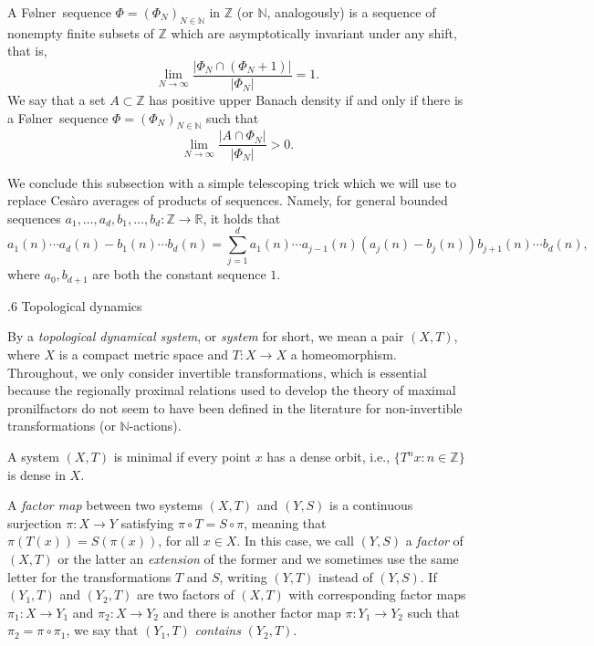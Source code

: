 \documentclass[reqno]{amsart}
\makeatletter
\def\R{{\mathbb R}}
\def\Z{{\mathbb Z}}
\def\N{{\mathbb N}}
\theoremstyle{definition}
\def\subsection{\@startsection{subsection}{2}%
  \z@{.4\linespacing\@plus.7\linespacing}
{.6\baselineskip}%
  {\normalfont\centering\bfseries}%
}
\theoremstyle{remark}
\def\N{{\mathbb N}}
\newcommand{\Folner}{F\o{}lner}
\makeatother
\begin{document}
A \Folner\ sequence $\Phi=(\Phi_N)_{N\in \N}$ in $\Z$ (or $\N$, analogously)  
is a sequence of nonempty finite subsets of $\Z$ which are 
asymptotically invariant under any shift, that is, 
$$\lim_{N\to \infty} \frac{|\Phi_N \cap (\Phi_N+1)|}{|\Phi_N|}=1.$$
We say that a set $A\subset \Z$ has positive upper Banach density if and only if there is a \Folner\ sequence $\Phi=(\Phi_N)_{N\in \N}$ such that 
$$ \lim_{N\to \infty} \frac{|A\cap \Phi_N|}{|\Phi_N|}>0.$$

We conclude this subsection with a simple telescoping trick which we will use 
to replace Ces\`aro averages of products of sequences. 
Namely, for general bounded sequences $a_1,\ldots,a_d,b_1,\ldots,b_d:\Z\to \R$, it 
holds that 
\begin{equation}\label{eq:18}
a_1(n)\cdots a_d(n)- b_1(n)\cdots b_d(n)=\sum_{j=1}^d a_1(n)\cdots a_{j-1}(n)(a_j(n)-b_j(n))b_{j+1}(n)\cdots b_d(n),
\end{equation} 
where $a_0, b_{d+1}$ are both the constant sequence $1$. 

\subsection{Topological dynamics}\label{prel dynamics}

By a \textit{topological dynamical system}, or \textit{system} for short, we mean a pair $(X,T)$, 
where $X$ is a compact metric space and $T: X\to X$ a 
homeomorphism. 
Throughout, we only consider invertible transformations, which is 
essential because the regionally proximal relations used to 
develop the theory of maximal pronilfactors do not seem to have 
been defined in the literature for non-invertible transformations (or $\N$-actions). 

A system $(X,T)$ is minimal if every point $x$ has a dense orbit, 
i.e., $\{T^nx: n\in \Z\}$ is dense in $X$. 

A \textit{factor map} between two systems $(X,T)$ and $(Y,S)$ is a 
continuous surjection $\pi:X\to Y$ satisfying 
$\pi \circ T=S\circ \pi$, meaning that $\pi(T(x))=S(\pi(x))$, 
for all $x\in X$. In this case, we call $(Y,S)$ a \textit{factor} 
of $(X,T)$ or the latter an \textit{extension} of the former and 
we sometimes use the same letter for the transformations $T$ and 
$S$, writing $(Y,T)$ instead of $(Y,S)$. If $(Y_1,T)$ and $(Y_2,T)$ are two factors of $(X,T)$ with corresponding factor maps $\pi_1:X\to Y_1$ and $\pi_2:X\to Y_2$ and there is another factor map $\pi:Y_1\to Y_2$ such that $\pi_2=\pi \circ \pi_1$, we say that $(Y_1,T)$ \textit{contains} $(Y_2,T)$. 
\end{document}
